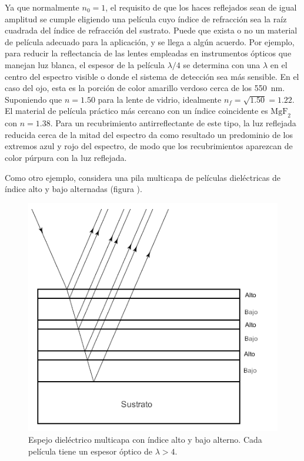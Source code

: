 \documentclass[14pt]{extarticle}
\begin{document}
Ya que normalmente $n_{0} = 1$, el requisito de que los haces reflejados sean de igual amplitud se cumple eligiendo una película cuyo índice de refracción sea la raíz cuadrada del índice de refracción del sustrato. Puede que exista o no un material de película adecuado para la aplicación, y se llega a algún acuerdo. Por ejemplo, para reducir la reflectancia de las lentes empleadas en instrumentos ópticos que manejan luz blanca, el espesor de la película $\lambda/4$ se determina con una $\lambda$ en el centro del espectro visible o donde el sistema de detección sea más sensible. En el caso del ojo, esta es la porción de color amarillo verdoso cerca de los \SI{550}{\nano\meter}. Suponiendo que $n = 1.50$ para la lente de vidrio, idealmente $n_{f} = \sqrt{1.50} = 1.22$. El material de película práctico más cercano con un índice coincidente es $\text{MgF}_{2}$ con $n = 1.38$. Para un recubrimiento antirreflectante de este tipo, la luz reflejada reducida cerca de la mitad del espectro da como resultado un predominio de los extremos azul y rojo del espectro, de modo que los recubrimientos aparezcan de color púrpura con la luz reflejada.
\par
Como otro ejemplo, considera una pila multicapa de películas dieléctricas de índice alto y bajo alternadas (figura ).
\begin{figure}[H]
    \centering
    \includegraphics[scale=0.8]{Imagenes/Interferencia2_08.png}
    \caption{Espejo dieléctrico multicapa con índice alto y bajo alterno. Cada película tiene un espesor óptico de $\lambda > 4$.}
    \label{fig:figura_07_11}
\end{figure}
\end{document}
